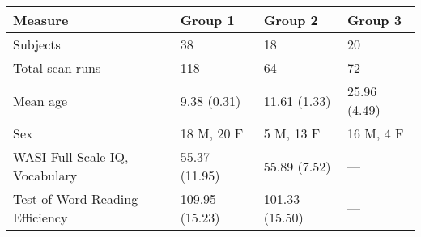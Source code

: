\begin{tabular}{llll}
\toprule
Measure &               Group 1 &  Group 2 &              Group 3 \\
\midrule
Subjects                        &              38 &              18 &            20 \\
Total scan runs                 &             118 &              64 &            72 \\
Mean age                        &     9.38 (0.31) &    11.61 (1.33) &  25.96 (4.49) \\
Sex                             &      18 M, 20 F &       5 M, 13 F &     16 M, 4 F \\
WASI Full-Scale IQ, Vocabulary  &   55.37 (11.95) &    55.89 (7.52) &   --- \\
Test of Word Reading Efficiency &  109.95 (15.23) &  101.33 (15.50) &   --- \\
\bottomrule
\end{tabular}